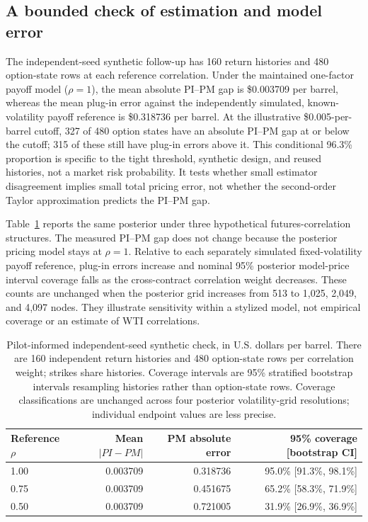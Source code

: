 \subsection{A bounded check of estimation and model error}

The independent-seed synthetic follow-up has 160 return histories and
480 option-state rows at each reference correlation. Under the maintained
one-factor payoff model ($\rho=1$), the mean absolute PI--PM gap is
\$0.003709 per barrel, whereas the mean plug-in error against the independently
simulated, known-volatility payoff reference is \$0.318736 per barrel.
At the illustrative \$0.005-per-barrel cutoff, 327 of 480 option states
have an absolute PI--PM gap at or below the cutoff; 315 of these still have
plug-in errors above it. This conditional 96.3\% proportion is specific to
the tight threshold, synthetic design, and reused histories, not a market
risk probability. It tests whether small estimator disagreement implies
small total pricing error, not whether the second-order Taylor approximation
predicts the PI--PM gap.

Table~\ref{tab:short_controlled_stress} reports the same posterior under
three hypothetical futures-correlation structures. The measured PI--PM
gap does not change because the posterior pricing model stays at $\rho=1$.
Relative to each separately simulated fixed-volatility payoff reference,
plug-in errors increase and nominal 95\% posterior model-price interval
coverage falls as the cross-contract correlation weight decreases.
These counts are unchanged when the posterior grid increases
from 513 to 1,025, 2,049, and 4,097 nodes. They illustrate
sensitivity within a stylized model, not empirical coverage or an
estimate of WTI correlations.

\begin{table}[t]
\centering
\caption{Pilot-informed independent-seed synthetic check, in U.S. dollars
per barrel. There are 160 independent return histories and 480 option-state
rows per correlation weight; strikes share histories. Coverage intervals
are 95\% stratified bootstrap intervals resampling histories rather than
option-state rows. Coverage classifications are unchanged across four posterior
volatility-grid resolutions; individual endpoint values are less precise.}
\label{tab:short_controlled_stress}
\begin{tabular}{lrrr}
\toprule
Reference $\rho$ & Mean $|PI-PM|$ & PM absolute error & 95\% coverage [bootstrap CI]\\
\midrule
1.00 & 0.003709 & 0.318736 & 95.0\% [91.3\%, 98.1\%]\\
0.75 & 0.003709 & 0.451675 & 65.2\% [58.3\%, 71.9\%]\\
0.50 & 0.003709 & 0.721005 & 31.9\% [26.9\%, 36.9\%]\\
\bottomrule
\end{tabular}
\end{table}


